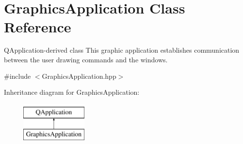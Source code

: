\hypertarget{class_d_o_1_1_graphics_application}{\section{Graphics\-Application Class Reference}
\label{class_d_o_1_1_graphics_application}
}


Q\-Application-\/derived class This graphic application establishes communication between the user drawing commands and the windows.  




{\ttfamily \#include $<$Graphics\-Application.\-hpp$>$}

Inheritance diagram for Graphics\-Application\-:\begin{figure}[H]
\begin{center}
\leavevmode
\includegraphics[height=2.000000cm]{class_d_o_1_1_graphics_application}
\end{center}
\end{figure}
